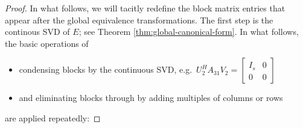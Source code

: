 \documentclass[]{book}
\providecommand{\tightlist}{%
  \setlength{\itemsep}{0pt}\setlength{\parskip}{0pt}}
\theoremstyle{definition}
\theoremstyle{definition}
\theoremstyle{definition}
\theoremstyle{definition}
\theoremstyle{remark}
\begin{document}
\begin{proof}
{}In what follows, we will tacitly redefine the block matrix entries that appear after the global equivalence transformations. The first step is the continous SVD of \(E\); see Theorem \ref{thm:global-canonical-form}. In what follows, the basic operations of

\begin{itemize}
\tightlist
\item
  condensing blocks by the continuous SVD, e.g.~\(U_2^HA_{31}V_2=\begin{bmatrix} I_s & 0 \\ 0 & 0 \end{bmatrix}\)
\item
  and eliminating blocks through by adding multiples of columns or rows
\end{itemize}

are applied repeatedly:


\end{proof}
\end{document}
